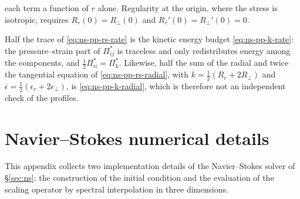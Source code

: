 \documentclass{article}
\begin{document}
each term a function of $r$ alone. Regularity at the origin, where the stress
is isotropic, requires $R_r(0) = R_\perp(0)$ and
$R_r'(0) = R_\perp'(0) = 0$.
\par
Half the trace of \eqref{eq:ns-pp-rs-rate} is the kinetic energy budget
\eqref{eq:ns-pp-k-rate}: the pressure--strain part of $\Pi_{ij}^*$ is
traceless and only redistributes energy among the components, and
$\tfrac12 \Pi_{ii}^* = \Pi_k^*$. Likewise, half the sum of the radial and twice
the tangential equation of \eqref{eq:ns-pp-rs-radial}, with
$\overline{k} = \tfrac12 (R_r + 2 R_\perp)$ and
$\overline{\epsilon} = \tfrac12 (\epsilon_r + 2\epsilon_\perp)$, is
\eqref{eq:ns-pp-k-radial}, which is therefore not an independent check of the
profiles.

\appendix


\section{Navier--Stokes numerical details}\label{app:ns-numerics}

This appendix collects two implementation details of the Navier--Stokes
solver of \S\ref{sec:ns}: the construction of the initial condition and the
evaluation of the scaling operator by spectral interpolation in three
dimensions.
\end{document}
